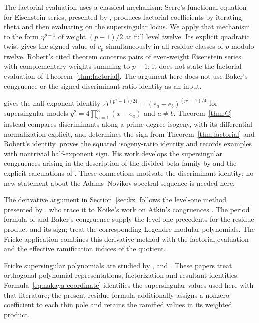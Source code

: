 \documentclass[11pt,a4paper]{article}
\numberwithin{equation}{section}
\theoremstyle{definition}
\theoremstyle{remark}
\begin{document}
The factorial evaluation uses a classical mechanism: Serre's functional
equation for Eisenstein series, presented by
\citet[\S2.5, Th\'eor\`eme~2, p.~119]{Robert80}, produces factorial
coefficients by iterating theta and then evaluating on the supersingular
locus. We apply that mechanism to the form $\eta^{p+1}$ of weight
$(p+1)/2$ at full level twelve. Its explicit quadratic twist gives the
signed value of $c_p$ simultaneously in all residue classes of $p$
modulo twelve. Robert's cited theorem concerns pairs of even-weight
Eisenstein series with complementary weights summing to $p+1$; it does
not state the factorial evaluation of Theorem~\ref{thm:factorial}. The argument here does not use
Baker's congruence or the signed discriminant-ratio identity as an input.

\citet[Theorem~3, p.~72; \S4]{Landweber88} gives the
half-exponent identity
$\Delta^{(p^2-1)/24}=(e_a-e_b)^{(p^2-1)/4}$ for supersingular
models $y^2=4\prod_{a=1}^3(x-e_a)$ and $a\ne b$.
Theorem~\ref{thm:C} instead compares discriminants along a prime-degree
isogeny, with its differential normalization explicit, and determines
the sign from Theorem~\ref{thm:factorial} and Robert's identity.
\citet[Theorem~1.2 and Remark~4]{Ono25}
proves the squared isogeny-ratio identity and records examples with nontrivial
half-exponent sign. His work develops the supersingular congruences arising in
the description of the divided beta family by \citet[Theorem~1.2]{Behrens09}
and the explicit calculations of \citet[\S5.4, Conjecture~5.17]{Larson20}.
These connections motivate the discriminant identity; no new statement about the
Adams--Novikov spectral sequence is needed here.

The derivative argument in Section~\ref{sec:kz} follows the level-one
method presented by \citet[\S10]{KZ98}, who trace it to Koike's work
on Atkin's congruences \citep{Koike73}. The period formula of
\citet{dS94} and Baker's congruence supply the level-one precedents
for the residue product and its sign; \citet{BL18} treat the
corresponding Legendre modular polynomials. The Fricke application
combines this derivative method with the factorial evaluation and
the effective ramification indices of the quotient.

Fricke supersingular polynomials are studied by \citet{Sakai11,Sakai14},
\citet{Nakaya19} and \citet{Morton23}. These papers treat
orthogonal-polynomial representations, factorization and resultant
identities. Formula~\eqref{eq:nakaya-coordinate} identifies the supersingular
values used here with that literature; the present residue formula additionally
assigns a nonzero coefficient to each thin pole and retains the ramified values
in its weighted product.
\end{document}
